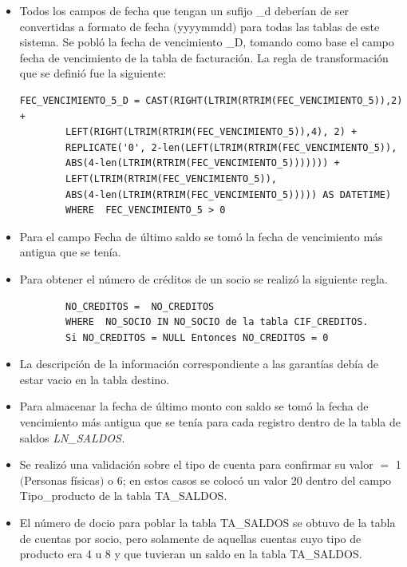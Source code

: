 \begin{itemize}

\item Todos los campos de fecha que tengan un sufijo \_d deberían de ser
  convertidas a formato de fecha $($yyyymmdd$)$ para todas las tablas de este
  sistema. Se pobló la fecha de vencimiento \_D, tomando como base el campo
  fecha de vencimiento de la tabla de facturación. La regla de transformación
  que se definió fue la siguiente:

\begin{verbatim}
FEC_VENCIMIENTO_5_D = CAST(RIGHT(LTRIM(RTRIM(FEC_VENCIMIENTO_5)),2) +
        LEFT(RIGHT(LTRIM(RTRIM(FEC_VENCIMIENTO_5)),4), 2) +
        REPLICATE('0', 2-len(LEFT(LTRIM(RTRIM(FEC_VENCIMIENTO_5)),
        ABS(4-len(LTRIM(RTRIM(FEC_VENCIMIENTO_5))))))) +
        LEFT(LTRIM(RTRIM(FEC_VENCIMIENTO_5)),
        ABS(4-len(LTRIM(RTRIM(FEC_VENCIMIENTO_5))))) AS DATETIME)
        WHERE  FEC_VENCIMIENTO_5 > 0
\end{verbatim}

\item Para el campo Fecha de último saldo se tomó la fecha de vencimiento más
  antigua que se tenía.
\item Para obtener el número de créditos de un socio se realizó la siguiente
  regla.

\begin{verbatim}
        NO_CREDITOS =  NO_CREDITOS
        WHERE  NO_SOCIO IN NO_SOCIO de la tabla CIF_CREDITOS.
        Si NO_CREDITOS = NULL Entonces NO_CREDITOS = 0
\end{verbatim}

\item La descripción de la información correspondiente a las garantías debía
  de estar vacio en la tabla destino.

\item Para almacenar la fecha de último monto con saldo se tomó la fecha de
  vencimiento más antigua que se tenía para cada registro dentro de la tabla de
  saldos \textit{LN\_SALDOS.}

\item Se realizó una validación sobre el tipo de cuenta para confirmar su
  valor $=$ 1 $($Personas físicas$)$ o 6; en estos casos se colocó un valor 20
  dentro del campo Tipo\_producto de la tabla TA\_SALDOS.

\item El número de docio para poblar la tabla TA\_SALDOS se obtuvo de la
  tabla de cuentas por socio, pero solamente de aquellas cuentas cuyo tipo de
  producto era 4 u 8 y que tuvieran un saldo en la tabla TA\_SALDOS.


\end{itemize}
